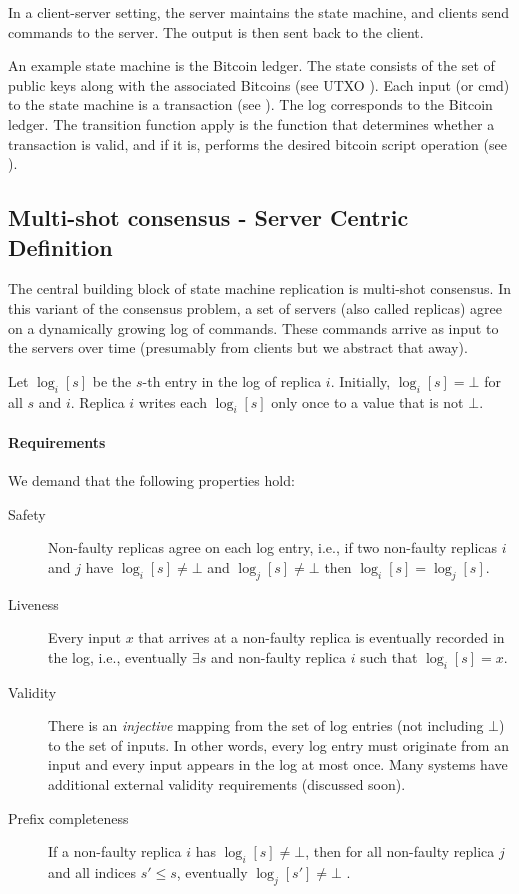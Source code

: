 In a client-server setting, the server maintains the state machine,
 and clients send commands to the server. 
 The output is then sent back to the client.

An example state machine is the Bitcoin ledger. 
The state consists of the set of public keys along with the associated 
Bitcoins (see UTXO ). 
Each input (or cmd) to the state machine is a transaction 
(see ).
The log corresponds to the Bitcoin ledger. 
The transition function apply is the function that determines whether a 
transaction is valid, and if it is, 
performs the desired bitcoin script operation (see ).

\subsection{Multi-shot consensus - Server Centric Definition}
The central building block of state machine replication is multi-shot consensus.
In this variant of the consensus problem, a set of servers (also called replicas)
 agree on a dynamically growing log of commands.
 These commands arrive as input to the servers over time 
 (presumably from clients but we abstract that away).

Let $\log_i[s]$ be the $s$-th entry in the log of replica $i$. 
Initially, $\log_i[s]=\bot$ for all $s$ and $i$. 
Replica $i$ writes each $\log_i[s]$ only once to a value that is not 
$\bot$.

\paragraph{Requirements}
We demand that the following properties hold:
\begin{description}
    \item[Safety] Non-faulty replicas agree on 
    each log entry, i.e., if two non-faulty replicas $i$ and $j$ have 
    $\log_i[s] \ne\bot$ and $\log_j[s]\ne\bot$ then $\log_i[s] = \log_j[s]$.

    \item[Liveness] Every input $x$ that arrives at 
    a non-faulty replica is eventually recorded in the log,
     i.e., eventually $\exists s$ and non-faulty replica $i$ such that $\log_i[s]=x$.

    \item[Validity] There is an \emph{injective} mapping from the set of 
    log entries (not including $\bot$) to the set of inputs.
    In other words, every log entry must originate from an input and 
    every input appears in the log at most once. 
    Many systems have additional external validity requirements (discussed soon).

    \item[Prefix completeness]
    If a non-faulty replica $i$ has $\log_i[s] \ne\bot$,
    then for all non-faulty replica $j$ and all indices $s'\le s$,
    eventually $\log_j[s'] \ne\bot$ .

\end{description}


